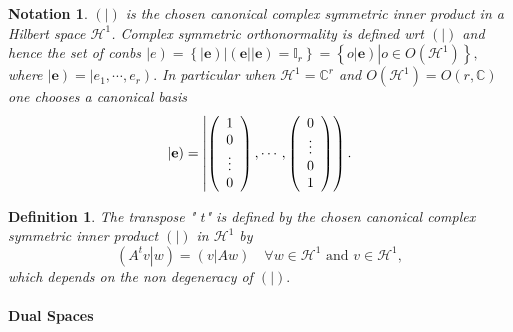 \documentclass[aps,preprint]{revtex4}%
\newtheorem{definition}[theorem]{Definition}
\newtheorem{notation}[theorem]{Notation}
\begin{document}
\begin{notation}
$\left(  \left.  {}\right\vert \right)  $ is the chosen canonical complex
symmetric inner product in a Hilbert space $\mathcal{H}^{1}$. \emph{C}omplex
symmetric \emph{o}rthonormality is defined wrt $\left(  \left.  {}\right\vert
\right)  $ and hence the set of conbs $\left\vert e\right)  =\left\{  \left.
\left\vert \mathbf{e}\right)  \right\vert \left(  \mathbf{e}\right\vert
\left\vert \mathbf{e}\right)  =\mathbb{I}_{r}\right\}  =\left\{  \left.
\overset{}{o\left\vert \mathbf{e}\right)  }\right\vert o\in O\left(
\mathcal{H}^{1}\right)  \right\}  ,$ where $\left\vert \mathbf{e}\right)
=\left\vert e_{1},\cdots,e_{r}\right)  .$ In particular when $\mathcal{H}%
^{1}=\mathbb{C}^{r}$ and $O\left(  \mathcal{H}^{1}\right)  =O\left(
r,\mathbb{C}\right)  $ one chooses a canonical basis
\begin{equation}
\left\vert \mathbf{e}\right)  =\left\vert \left(
\begin{array}
[c]{c}%
1\\
0\\
\vdots\\
0
\end{array}
\right)  ,\cdots,\left(
\begin{array}
[c]{c}%
0\\
\vdots\\
0\\
1
\end{array}
\right)  \right)  .
\end{equation}

\end{notation}

\begin{definition}
The \emph{transpose} " $t$" is defined by the chosen canonical complex
symmetric inner product $\left(  \left.  {}\right\vert \right)  $ in
$\mathcal{H}^{1}$ by
\begin{equation}
\left(  \left.  A^{t}v\right\vert w\right)  =\left(  \left.  v\right\vert
Aw\right)  \quad\forall w\in\mathcal{H}^{1}\text{ and }v\in\mathcal{H}^{1},
\end{equation}
which depends on the \emph{non }degeneracy of $\left(  \left.  {}\right\vert
\right)  .$
\end{definition}

\paragraph{Dual Spaces \label{Dual Spaces}}
\end{document}
